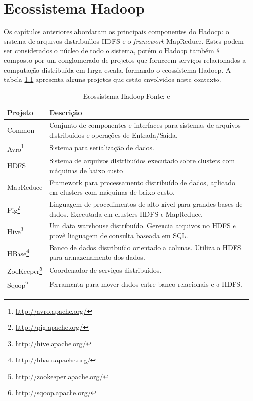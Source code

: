 \chapter{Ecossistema Hadoop}
\label{cap:eco}

Os capítulos anteriores abordaram os principais componentes do Hadoop: o sistema de arquivos distribuídos HDFS e o \textit{framework} MapReduce. Estes podem ser considerados o núcleo de todo o sistema, porém o Hadoop também é composto por um conglomerado de projetos que fornecem serviços relacionados a computação distribuída em larga escala, formando o ecossistema Hadoop. A tabela \ref{tab-eco} apresenta alguns projetos que estão envolvidos neste contexto.

\begin{savenotes}
\begin{table}[!ht]
\begin{center}
  \begin{tabular}{|p{3cm}|p{7cm}|}
	\hline
	Projeto & Descrição
	\\ \hline
	Common & Conjunto de componentes e interfaces para sistemas de arquivos distribuídos e operações de Entrada/Saída.
	\\ \hline
	Avro\footnote{\url{http://avro.apache.org/}} & Sistema para serialização de dados.
	\\ \hline
	HDFS & Sistema de arquivos distribuídos executado sobre clusters com máquinas de baixo custo
	\\ \hline
	MapReduce & Framework para processamento distribuído de dados, aplicado em clusters com máquinas de baixo custo.
	\\ \hline
	Pig\footnote{\url{http://pig.apache.org/}} & Linguagem de procedimentos de alto nível para grandes bases de dados. Executada em clusters HDFS e MapReduce.
	\\ \hline
	Hive\footnote{\url{http://hive.apache.org/}} & Um data warehouse distribuído. Gerencia arquivos no HDFS e provê linguagem de consulta baseada em SQL.
	\\ \hline
	HBase\footnote{\url{http://hbase.apache.org/}} & Banco de dados distribuído orientado a colunas. Utiliza o HDFS para armazenamento dos dados.
	\\ \hline
	ZooKeeper\footnote{\url{http://zookeeper.apache.org/}} & Coordenador de serviços distribuídos.
	\\ \hline
	Sqoop\footnote{\url{http://sqoop.apache.org/}} & Ferramenta para mover dados entre banco relacionais e o HDFS.
	\\ \hline
  \end{tabular}
  \captionsetup{justification=centering}
  \caption[Ecossistema Hadoop]{Ecossistema Hadoop
  \protect\linebreak Fonte: \cite{white2012} e \cite{shvachko2010}}
\label{tab-eco}
\end{center}
\end{table}
\end{savenotes}

